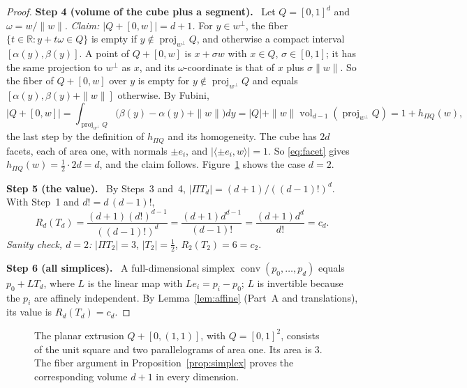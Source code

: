 \documentclass[11pt]{article}
\newcommand{\R}{\mathbb R}
\DeclareMathOperator{\conv}{conv}
\DeclareMathOperator{\vol}{vol}
\DeclareMathOperator{\proj}{proj}
\newcommand{\step}[1]{\par\smallskip\noindent\textbf{#1}\ }
\begin{document}
\begin{proof}
\step{Step 4 (volume of the cube plus a segment).} Let \(Q=[0,1]^d\)
and \(\omega=w/\|w\|\). \emph{Claim: \(|Q+[0,w]|=d+1\).} For
\(y\in w^\perp\), the fiber \(\{t\in\R:y+t\omega\in Q\}\) is empty if
\(y\notin\proj_{w^\perp}Q\), and otherwise a compact interval
\([\alpha(y),\beta(y)]\). A point of \(Q+[0,w]\) is \(x+\sigma w\) with
\(x\in Q\), \(\sigma\in[0,1]\); it has the same projection to
\(w^\perp\) as \(x\), and its \(\omega\)-coordinate is that of \(x\)
plus \(\sigma\|w\|\). So the fiber of \(Q+[0,w]\) over \(y\) is empty
for \(y\notin\proj_{w^\perp}Q\) and equals
\([\alpha(y),\beta(y)+\|w\|]\) otherwise. By Fubini,
\[
 |Q+[0,w]|
 =\int_{\proj_{w^\perp}Q}\bigl(\beta(y)-\alpha(y)+\|w\|\bigr)dy
 =|Q|+\|w\|\vol_{d-1}(\proj_{w^\perp}Q)
 =1+h_{\Pi Q}(w),
\]
the last step by the definition of \(h_{\Pi Q}\) and its homogeneity.
The cube has \(2d\) facets, each of area one, with normals \(\pm e_i\),
and \(|\langle\pm e_i,w\rangle|=1\). So \eqref{eq:facet} gives
\(h_{\Pi Q}(w)=\tfrac12\cdot2d=d\), and the claim follows.
Figure~\ref{fig:extrusion} shows the case \(d=2\).

\step{Step 5 (the value).} By Steps~3 and~4,
\(|\Pi T_d|=(d+1)/((d-1)!)^d\). With Step~1 and \(d!=d\,(d-1)!\),
\[
 R_d(T_d)=\frac{(d+1)(d!)^{d-1}}{((d-1)!)^d}
 =\frac{(d+1)d^{d-1}}{(d-1)!}
 =\frac{(d+1)d^d}{d!}=c_d.
\]
\emph{Sanity check, \(d=2\):} \(|\Pi T_2|=3\), \(|T_2|=\tfrac12\),
\(R_2(T_2)=6=c_2\).

\step{Step 6 (all simplices).} A full-dimensional simplex
\(\conv(p_0,\ldots,p_d)\) equals \(p_0+LT_d\), where \(L\) is the linear
map with \(Le_i=p_i-p_0\); \(L\) is invertible because the \(p_i\) are
affinely independent. By Lemma~\ref{lem:affine} (Part~A and
translations), its value is \(R_d(T_d)=c_d\).
\end{proof}

\begin{figure}[tb]
\centering
{}
\caption{The planar extrusion \(Q+[0,(1,1)]\), with
\(Q=[0,1]^2\), consists of the unit square and two parallelograms of
area one. Its area is \(3\). The fiber argument in
Proposition~\ref{prop:simplex} proves the corresponding volume \(d+1\)
in every dimension.}
\label{fig:extrusion}
\end{figure}
\end{document}
